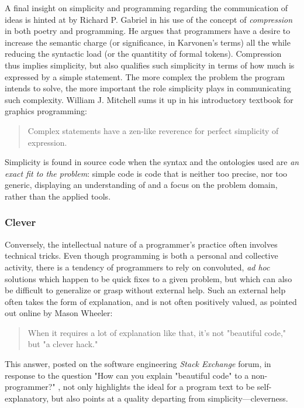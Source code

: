 A final insight on simplicity and programming regarding the communication of ideas is hinted at by Richard P. Gabriel in his use of the concept of \emph{compression} in both poetry and programming. He argues that programmers have a desire to increase the semantic charge (or significance, in Karvonen's terms) all the while reducing the syntactic load (or the quantitity of formal tokens). Compression thus implies simplicity, but also qualifies such simplicity in terms of how much is expressed by a simple statement. The more complex the problem the program intends to solve, the more important the role simplicity plays in communicating such complexity. William J. Mitchell sums it up in his introductory textbook for graphics programming:

\begin{quote}
  Complex statements have a zen-like reverence for perfect simplicity of expression. \citep{mitchell_art_1987}
\end{quote}

Simplicity is found in source code when the syntax and the ontologies used are \emph{an exact fit to the problem}: simple code is code that is neither too precise, nor too generic, displaying an understanding of and a focus on the problem domain, rather than the applied tools. 

\subsubsection{Clever}
\label{subsubsec:cleverness}

Conversely, the intellectual nature of a programmer's practice often involves technical tricks. Even though programming is both a personal and collective activity, there is a tendency of programmers to rely on convoluted, \emph{ad hoc} solutions which happen to be quick fixes to a given problem, but which can also be difficult to generalize or grasp without external help. Such an external help often takes the form of explanation, and is not often positively valued, as pointed out online by Mason Wheeler:

\begin{quote}
  When it requires a lot of explanation like that, it's not "beautiful code," but "a clever hack." \citep{stackoverflow_how_2013}
\end{quote}

This answer, posted on the software engineering \emph{Stack Exchange} forum, in response to the question "How can you explain "beautiful code" to a non-programmer?" \citep{stackoverflow_how_2013}, not only highlights the ideal for a program text to be self-explanatory, but also points at a quality departing from simplicity—cleverness.


